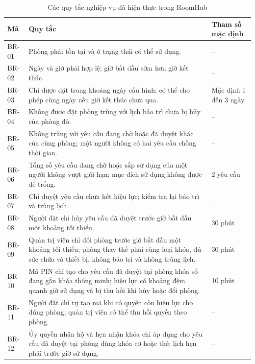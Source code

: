 \documentclass[../DoAn.tex]{subfiles}
\begin{document}
\begin{table}[H]
\centering\small
\renewcommand{\arraystretch}{1.15}
\caption{Các quy tắc nghiệp vụ đã hiện thực trong RoomHub}
\label{tab:br}
\begin{tabularx}{\textwidth}{|p{1.3cm}|X|p{3.4cm}|}
\hline
\textbf{Mã} & \textbf{Quy tắc} & \textbf{Tham số mặc định} \\ \hline
BR-01 & Phòng phải tồn tại và ở trạng thái có thể sử dụng. & -- \\ \hline
BR-02 & Ngày và giờ phải hợp lệ; giờ bắt đầu sớm hơn giờ kết thúc. & -- \\ \hline
BR-03 & Chỉ được đặt trong khoảng ngày cấu hình; có thể cho phép cùng ngày nếu giờ kết thúc chưa qua. & Mặc định 1 đến 3 ngày \\ \hline
BR-04 & Không được đặt phòng trùng với lịch bảo trì chưa bị hủy của phòng đó. & -- \\ \hline
BR-05 & Không trùng với yêu cầu đang chờ hoặc đã duyệt khác của cùng phòng; một người không có hai yêu cầu chồng thời gian. & -- \\ \hline
BR-06 & Tổng số yêu cầu đang chờ hoặc sắp sử dụng của một người không vượt giới hạn; mục đích sử dụng không được để trống. & 2 yêu cầu \\ \hline
BR-07 & Chỉ duyệt yêu cầu chưa hết hiệu lực; kiểm tra lại bảo trì và trùng lịch. & -- \\ \hline
BR-08 & Người đặt chỉ hủy yêu cầu đã duyệt trước giờ bắt đầu một khoảng tối thiểu. & 30 phút \\ \hline
BR-09 & Quản trị viên chỉ đổi phòng trước giờ bắt đầu một khoảng tối thiểu; phòng thay thế phải cùng loại khóa, đủ sức chứa và thiết bị, không bảo trì và không trùng lịch. & 30 phút \\ \hline
BR-10 & Mã PIN chỉ tạo cho yêu cầu đã duyệt tại phòng khóa số đang gắn khóa thông minh; hiệu lực có khoảng đệm quanh giờ sử dụng và bị thu hồi khi hủy hoặc đổi phòng. & 10 phút \\ \hline
BR-11 & Người đặt chỉ tự tạo mã khi có quyền còn hiệu lực cho đúng phòng; quản trị viên có thể thu hồi quyền theo phòng. & -- \\ \hline
BR-12 & Ủy quyền nhận hộ và hẹn nhận khóa chỉ áp dụng cho yêu cầu đã duyệt tại phòng dùng khóa cơ hoặc thẻ; lịch hẹn phải trước giờ sử dụng. & -- \\ \hline
\end{tabularx}
\end{table}
\end{document}
